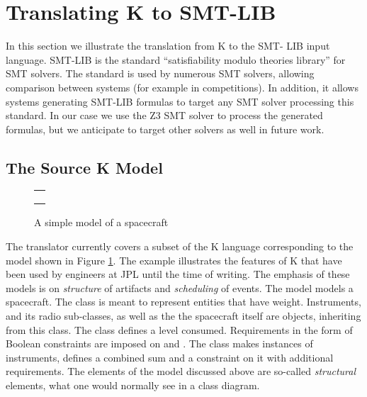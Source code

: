 
\section{Translating K to SMT-LIB}
\label{sec:k2smt}

In this section we illustrate the translation from K to the SMT-
LIB input language. SMT-LIB \cite{smt-lib} is the standard 
``satisfiability modulo theories library'' for SMT solvers. The 
standard is used by numerous SMT solvers, allowing comparison 
between systems (for example in competitions). 
In addition, it allows systems generating SMT-LIB 
formulas to target any SMT solver processing this standard. In our 
case we  use the Z3 SMT solver \cite{de2008z3} to process the generated formulas, 
but we anticipate to target other solvers as well in future work.

\subsection{The Source K Model}

\begin{figure}
\centering
\begin{tabular}{c}
\hline \\
 \\ \\
\hline
\end{tabular}
\caption{A simple \Klang{} model of a spacecraft}
\label{fig:spacecraftSmt}
\end{figure}

The translator currently covers a subset of the K language
corresponding to the model shown in Figure 
\ref{fig:spacecraftSmt}. The example illustrates the features
of K that have been used by engineers at JPL until the time of 
writing. The emphasis of these models is on {\em structure}
of artifacts and {\em scheduling} of events. The model models a 
spacecraft. The class  is meant to represent entities 
that have weight. Instruments, and its radio sub-classes, as well
as the the spacecraft itself are objects, inheriting from this 
class. The class  defines a  level 
consumed. Requirements in the form of Boolean constraints are 
imposed on  and . The 
 class makes instances of instruments,
defines a combined sum  and a
constraint on it with additional requirements. The elements of
the model discussed above are so-called {\em structural} elements,
what one would normally see in a class diagram.

